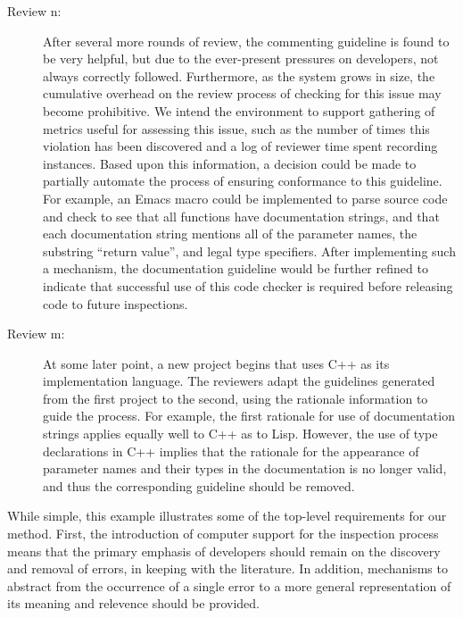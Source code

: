 \begin{description}
\item [Review n:] After several more rounds of review, the
  commenting guideline is found to be very helpful, but due to the
  ever-present pressures on developers, not always correctly followed.
  Furthermore, as the system grows in size, the cumulative overhead on
  the review process of checking for this issue may become
  prohibitive. We intend the environment to support gathering of
  metrics useful for assessing this issue, such as the number of times
  this violation has been discovered and a log of reviewer time spent
  recording instances.  Based upon this information, a decision could
  be made to partially automate the process of ensuring conformance to
  this guideline.  For example, an Emacs macro could be implemented to
  parse source code and check to see that all functions have
  documentation strings, and that each documentation string mentions
  all of the parameter names, the substring ``return value'', and
  legal type specifiers.  After implementing such a mechanism, the
  documentation guideline would be further refined to indicate that
  successful use of this code checker is required before releasing
  code to future inspections.
  
\item [Review m:] At some later point, a new project begins that
  uses C++ as its implementation language. The reviewers adapt the
  guidelines generated from the first project to the second, using the
  rationale information to guide the process. For example, the first
  rationale for use of documentation strings applies equally well to
  C++ as to Lisp. However, the use of type declarations in
  C++ implies that the rationale for the appearance of parameter names
  and their types in the documentation is no longer valid, and thus the
  corresponding guideline should be removed.
 
\end{description}

While simple, this example illustrates some of the top-level
requirements for our method. First, the introduction of computer
support for the inspection process means that the primary emphasis of
developers should remain on the discovery and removal of errors, in
keeping with the literature. In addition, mechanisms to abstract from
the occurrence of a single error to a more general representation of
its meaning and relevence should be provided.


